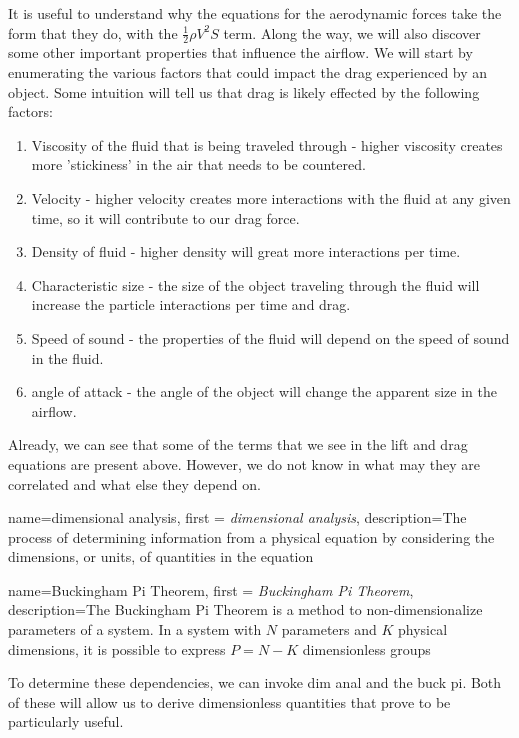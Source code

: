 \documentclass[12pt]{report}
\begin{document}
It is useful to understand why the equations for the aerodynamic forces take the form that they do, with the $\frac{1}{2}\rho V^2S$ term. Along the way, we will also discover some other important properties that influence the airflow. We will start by enumerating the various factors that could impact the drag experienced by an object. Some intuition will tell us that drag is likely effected by the following factors:
\begin{enumerate}
    \item Viscosity of the fluid that is being traveled through - higher viscosity creates more 'stickiness' in the air that needs to be countered.
    \item Velocity - higher velocity creates more interactions with the fluid at any given time, so it will contribute to our drag force.
    \item Density of fluid - higher density will great more interactions per time.
    \item Characteristic size - the size of the object traveling through the fluid will increase the particle interactions per time and drag.
    \item Speed of sound - the properties of the fluid will depend on the speed of sound in the fluid.
    \item \Gls{angle of attack} - the angle of the object will change the apparent size in the airflow.
\end{enumerate}
Already, we can see that some of the terms that we see in the lift and drag equations are present above. However, we do not know in what may they are correlated and what else they depend on.

{
    name=dimensional analysis,
    first = {\textit{dimensional analysis}},
    description={The process of determining information from a physical equation by considering the dimensions, or units, of quantities in the equation}
}

{
    name=Buckingham Pi Theorem,
    first = {\textit{Buckingham Pi Theorem}},
    description={The Buckingham Pi Theorem is a method to non-dimensionalize parameters of a system. In a system with $N$ parameters and $K$ physical dimensions, it is possible to express $P=N-K$ dimensionless groups}
}

To determine these dependencies, we can invoke \gls{dim anal} and the \gls{buck pi}. Both of these will allow us to derive dimensionless quantities that prove to be particularly useful.
\end{document}
